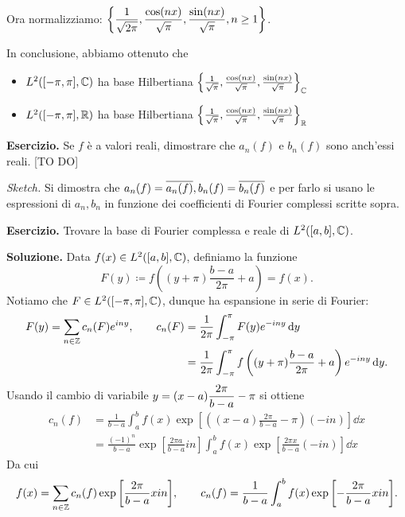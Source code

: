 Ora normalizziamo: $\displaystyle \left\{ \frac{1}{\sqrt{2\pi}}, \frac{\cos(nx)}{\sqrt{\pi}}, \frac{\sin(nx)}{\sqrt{\pi}}, n \geq 1 \right\}$.

In conclusione, abbiamo ottenuto che
\begin{itemize}

	\item $L^2( [-\pi,\pi], \mathbb C)$ ha base Hilbertiana $\left\{ \frac{1}{\sqrt{\pi}}, \frac{\cos(nx)}{\sqrt{\pi}}, \frac{\sin(nx)}{\sqrt{\pi}} \right\}_{\mathbb C}$


	\item $L^2( [-\pi,\pi], \mathbb R)$ ha base Hilbertiana $\left\{ \frac{1}{\sqrt{\pi}}, \frac{\cos(nx)}{\sqrt{\pi}}, \frac{\sin(nx)}{\sqrt{\pi}} \right\}_{\mathbb R}$ 

\end{itemize}

\textbf{Esercizio.}  Se $f$ è a valori reali, dimostrare che $a_n(f)$ e $b_n(f)$ sono anch'essi reali. [TO DO]

\textit{Sketch.} Si dimostra che $a_n(f) = \overline{a_n(f)}, b_n(f) = \overline{b_n(f)}$ e per farlo si usano le espressioni di $a_n, b_n$ in funzione dei coefficienti di Fourier complessi scritte sopra.


\textbf{Esercizio.} Trovare la base di Fourier complessa e reale di $L^2([a,b], \mathbb C) $.

\textbf{Soluzione.}
Data $f(x) \in L^2([a,b],\mathbb C)$, definiamo la funzione
%
$$
	F(y) \coloneqq  f\left( (y+\pi)\frac{b-a}{2\pi} + a \right) = f(x).
$$
%
Notiamo che $F \in L^2([-\pi,\pi],\mathbb C)$, dunque ha espansione in serie di Fourier:
%
\begin{align*}
	F(y) = \sum_{n \in \mathbb Z} c_n(F) e^{iny}, \qquad 
	c_n(F) & = \frac{1}{2\pi} \int_{-\pi}^\pi F(y) e^{-iny} \,\mathrm{d} y \\
	& = \frac{1}{2\pi} \int_{-\pi}^\pi f \left( (y+ \pi) \frac{b-a}{2\pi} + a \right) e^{-iny} \,\mathrm{d} y.
\end{align*}
Usando il cambio di variabile $\displaystyle y = (x-a) \frac{2\pi}{b-a} - \pi$ si ottiene
\begin{align*}
	c_n(f) & = \frac{1}{b-a} \int_a^b f(x) \exp{\left[ \left((x-a)\frac{2\pi}{b-a} - \pi\right)(-in)\right]} \dd x \\
	& = \frac{(-1)^n}{b-a}\exp{\left[ \frac{2\pi a}{b-a} in \right]} \int_a^b f(x) \exp{\left[ \frac{2\pi x}{b-a} (-in) \right]} \dd x 
\end{align*}
Da cui
%
$$
	f(x) = \sum_{n \in \mathbb Z} c_n(f) \exp{\left[ \frac{2\pi}{b-a}x in \right]}, \qquad 
	c_n(f) = \frac{1}{b-a} \int_a^b f(x) \exp{\left[- \frac{2\pi}{b-a}x in \right]}.
$$
%






